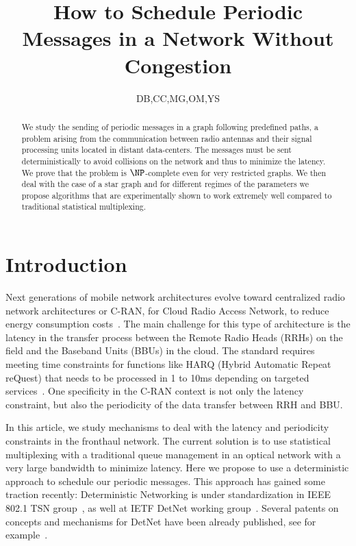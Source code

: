 \documentclass[a4paper,10pt]{article}
\title{How to Schedule Periodic Messages in a Network Without Congestion}
\author{DB,CC,MG,OM,YS}
\begin{document}
\maketitle

\begin{abstract}
We study the sending of periodic messages in a graph following predefined paths, a problem arising from the communication between radio antennas and their signal processing units located in distant data-centers. The messages must be sent deterministically to avoid collisions on the network and thus to minimize the latency. We prove that the problem is $\NP$-complete even for very restricted graphs. We then deal with the case of a star graph and for different regimes of the parameters we propose algorithms that are experimentally shown to work extremely well
compared to traditional statistical multiplexing.
\end{abstract}


\section{Introduction}

Next generations of mobile network architectures evolve toward centralized radio network architectures or C-RAN, for Cloud Radio Access Network, to reduce energy consumption costs~\cite{mobile2011c}. The main challenge for this type of architecture is the latency in the transfer process between the Remote Radio Heads (RRHs) on the field and the Baseband Units (BBUs) in the cloud. The standard requires meeting time constraints for functions like HARQ (Hybrid Automatic Repeat reQuest) that needs to be processed in 1 to 10ms depending on targeted services~\cite{bouguen2012lte}. One specificity in the C-RAN context is not only the latency constraint, but also the periodicity of the data transfer between RRH and BBU.

 In this article, we study mechanisms to deal with the latency and periodicity constraints in the fronthaul network.  The current solution is to use statistical multiplexing with a traditional queue management in an optical network with a very large bandwidth to minimize latency. Here we propose to use a deterministic approach to schedule our periodic messages. This approach has gained some traction recently: Deterministic Networking is under standardization in IEEE 802.1 TSN group~\cite{finn-detnet-architecture-08}, as well at IETF DetNet working group~\cite{ieee802}. Several patents on concepts and mechanisms for DetNet have been already published, see for example~\cite{howe2005time,leclerc2016transmission}.
\end{document}
